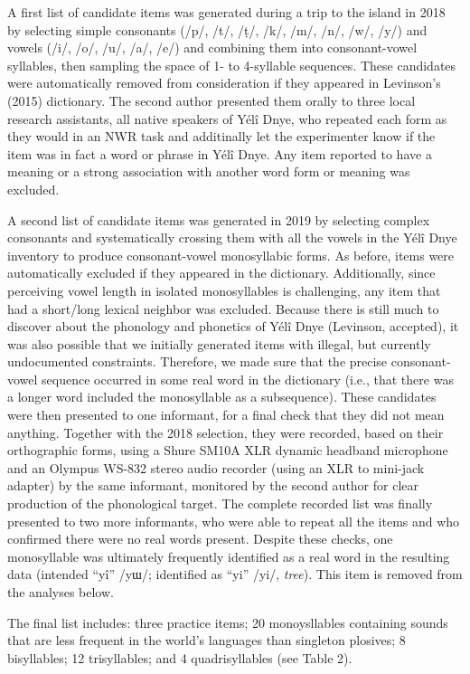 \documentclass[english,,man,floatsintext]{apa6}
\begin{document}
A first list of candidate items was generated during a trip to the
island in 2018 by selecting simple consonants (/p/, /t/, /ṭ/, /k/, /m/,
/n/, /w/, /y/) and vowels (/i/, /o/, /u/, /a/, /e/) and combining them
into consonant-vowel syllables, then sampling the space of 1- to
4-syllable sequences. These candidates were automatically removed from
consideration if they appeared in Levinson's (2015) dictionary. The
second author presented them orally to three local research assistants,
all native speakers of Yélî Dnye, who repeated each form as they would
in an NWR task and additinally let the experimenter know if the item was
in fact a word or phrase in Yélî Dnye. Any item reported to have a
meaning or a strong association with another word form or meaning was
excluded.

A second list of candidate items was generated in 2019 by selecting
complex consonants and systematically crossing them with all the vowels
in the Yélî Dnye inventory to produce consonant-vowel monosyllabic
forms. As before, items were automatically excluded if they appeared in
the dictionary. Additionally, since perceiving vowel length in isolated
monosyllables is challenging, any item that had a short/long lexical
neighbor was excluded. Because there is still much to discover about the
phonology and phonetics of Yélî Dnye (Levinson, accepted), it was also
possible that we initially generated items with illegal, but currently
undocumented constraints. Therefore, we made sure that the precise
consonant-vowel sequence occurred in some real word in the dictionary
(i.e., that there was a longer word included the monosyllable as a
subsequence). These candidates were then presented to one informant, for
a final check that they did not mean anything. Together with the 2018
selection, they were recorded, based on their orthographic forms, using
a Shure SM10A XLR dynamic headband microphone and an Olympus WS-832
stereo audio recorder (using an XLR to mini-jack adapter) by the same
informant, monitored by the second author for clear production of the
phonological target. The complete recorded list was finally presented to
two more informants, who were able to repeat all the items and who
confirmed there were no real words present. Despite these checks, one
monosyllable was ultimately frequently identified as a real word in the
resulting data (intended ``yî'' /yɯ/; identified as ``yi'' /yi/,
\emph{tree}). This item is removed from the analyses below.

The final list includes: three practice items; 20 monoysllables
containing sounds that are less frequent in the world's languages than
singleton plosives; 8 bisyllables; 12 trisyllables; and 4
quadrisyllables (see Table 2).
\end{document}
